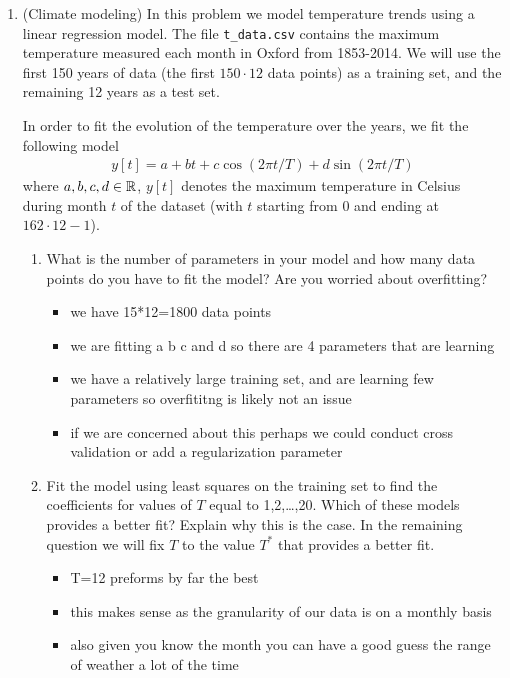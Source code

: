 \documentclass[12pt,twoside]{article}
\begin{document}
\begin{enumerate}
\begin{itemize}
\begin{enumerate}
    \end{enumerate}
\end{itemize}

\newpage
\item  (Climate modeling) In this problem we model temperature trends using a linear regression model. The file 
\texttt{t\_data.csv} contains the maximum temperature measured
  each month in Oxford from 1853-2014.  We will use the first
  150 years of data (the first $150\cdot 12$ data points) as a training set, and
  the remaining 12 years as a test set.

 In order to fit the evolution of the temperature over the years, we fit the following model
  \begin{align}
  y[t] = a + bt + c \cos(2\pi t/T) + d\sin(2\pi  t/T)
  \end{align}
  where $a,b,c,d\in\mathbb{R}$, $y[t]$ denotes the maximum temperature in Celsius during month $t$ of the dataset (with $t$ starting from $0$ and ending at $162\cdot 12-1$).
   
  \begin{enumerate}
  \item What is the number of parameters in your model and how many data points do you have to fit the model? Are you worried about overfitting?
\begin{itemize}
    \color{blue}
    \item we have 15*12=1800 data points 
    \item we are fitting a b c and d so there are 4 parameters that are learning 
    \item we have a relatively large training set, and are learning few parameters so overfititng is likely not an issue 
    \item if we are concerned about this perhaps we could conduct cross validation or add a regularization parameter 
\end{itemize}
  
  \item Fit the model using least squares on the training set to
    find the coefficients for values of $T$ equal to 1,2,\ldots,20. Which of these models provides a better fit? Explain why this is the case. In the remaining question we will fix $T$ to the value $T^{\ast}$ that provides a better fit.
    \begin{itemize}
        \color{blue}
        \item T=12 preforms by far the best 
        \item this makes sense as the granularity of our data is on a monthly basis
        \item also given you know the month you can have a good guess the range of weather a lot of the time 
        

\end{itemize}
\end{enumerate}
\end{enumerate}
\end{document}
